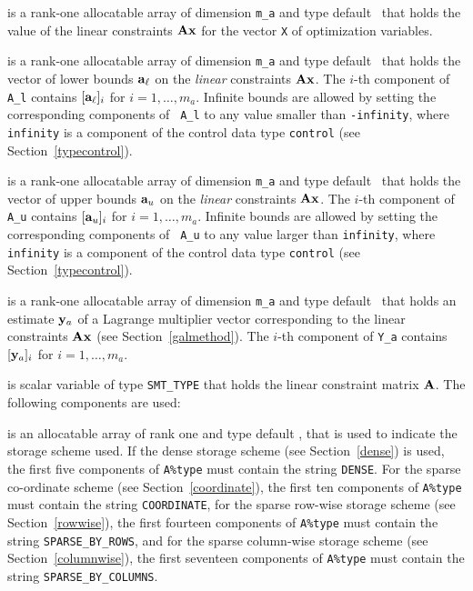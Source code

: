 \documentclass{galahad}
\begin{document}
\begin{description}
 is a rank-one allocatable array of dimension {\tt m\_a}
and type default \realdp\ that holds the value of the linear
constraints ${\mathbf{A}}{\mathbf{x}}$ for the vector {\tt X} of optimization variables.   

 is a rank-one allocatable array of dimension {\tt m\_a}
and type default \realdp\ that holds the vector of lower bounds
${\mathbf{a}}_\ell$ on the {\em linear} constraints ${\mathbf{A}}{\mathbf{x}}$. The $i$-th component of
{\tt A\_l} contains $[{\mathbf{a}}_\ell]_i$ for $i = 1, \ldots , m_a$.  Infinite
bounds are allowed by setting the corresponding components of {\tt
  A\_l} to any value smaller than {\tt -infinity}, where {\tt
  infinity} is a component of the control data type {\tt control} (see
Section~\ref{typecontrol}).

  is a rank-one allocatable array of dimension {\tt m\_a}
and type default \realdp\ that holds the vector of upper bounds
${\mathbf{a}}_u$ on the {\em linear} constraints ${\mathbf{A}}{\mathbf{x}}$. The $i$-th component of
{\tt A\_u} contains $[{\mathbf{a}}_u]_i$ for $i = 1, \ldots , m_a$.  Infinite
bounds are allowed by setting the corresponding components of {\tt
  A\_u} to any value larger than {\tt infinity}, where {\tt
  infinity} is a component of the control data type {\tt control} (see
Section~\ref{typecontrol}).

 is a rank-one allocatable array of dimension {\tt m\_a} and type 
default \realdp\ that holds an estimate ${\mathbf{y}}_a$ of a Lagrange
multiplier vector corresponding to the linear constraints ${\mathbf{A}}{\mathbf{x}}$ (see Section~\ref{galmethod}).
The $i$-th component of {\tt Y\_a} contains $[{\mathbf{y}}_a]_{i}$ for $i = 1,
\ldots , m_a$.


 is scalar variable of type {\tt SMT\_TYPE} 
that holds the linear constraint matrix ${\mathbf{A}}$. The following components
are used:

\begin{description}

 is an allocatable array of rank one and type default 
\character, that
is used to indicate the storage scheme used. If the dense storage scheme 
(see Section~\ref{dense}) is used, 
the first five components of {\tt A\%type} must contain the
string {\tt DENSE}.
For the sparse co-ordinate scheme (see Section~\ref{coordinate}), 
the first ten components of {\tt A\%type} must contain the
string {\tt COORDINATE},  
for the sparse row-wise storage scheme (see Section~\ref{rowwise}),
the first fourteen components of {\tt A\%type} must contain the
string {\tt SPARSE\_BY\_ROWS},
and for the sparse column-wise storage scheme (see Section~\ref{columnwise}),
the first seventeen components of {\tt A\%type} must contain the
string {\tt SPARSE\_BY\_COLUMNS}.


\end{description}
\end{description}
\end{document}

